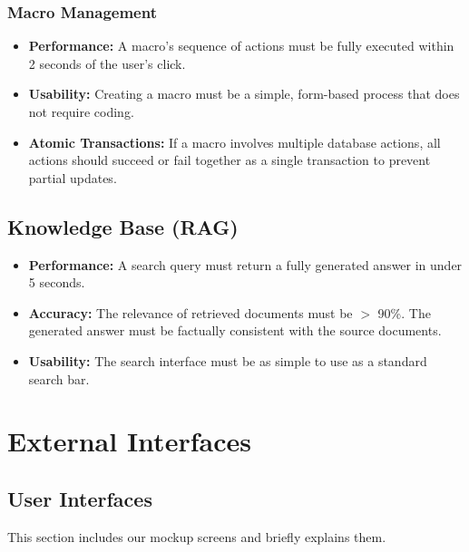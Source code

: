 \subsubsection{Macro Management}
\begin{itemize}
    \item \textbf{Performance:} A macro's sequence of actions must be fully executed within 2 seconds of the user's click.
    \item \textbf{Usability:} Creating a macro must be a simple, form-based process that does not require coding.
    \item \textbf{Atomic Transactions:} If a macro involves multiple database actions, all actions should succeed or fail together as a single transaction to prevent partial updates.
\end{itemize}

\subsection{Knowledge Base (RAG)}

\begin{itemize}
    \item \textbf{Performance:} A search query must return a fully generated answer in under 5 seconds.
    \item \textbf{Accuracy:} The relevance of retrieved documents must be $>$ 90\%. The generated answer must be factually consistent with the source documents.
    \item \textbf{Usability:} The search interface must be as simple to use as a standard search bar.
\end{itemize}

\section{External Interfaces}

\subsection{User Interfaces}
This section includes our mockup screens and briefly explains them.

\vspace{1cm}

